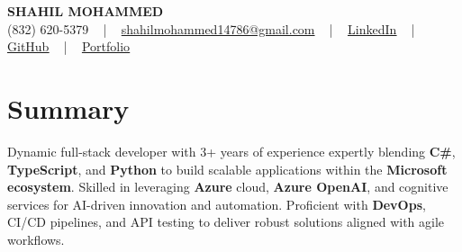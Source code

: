 \documentclass[letterpaper,10pt]{article}
\begin{document}
\begin{center}
    {\fontsize{14pt}{12pt}\selectfont \textbf{\MakeUppercase{Shahil Mohammed}}}\\ \vspace{2pt}
    \fontsize{10pt}{12pt}\selectfont (832) 620-5379 ~ | ~ \href{mailto:shahilmohammed14786@gmail.com}{shahilmohammed14786@gmail.com} ~ | ~  
    \href{https://www.linkedin.com/in/shahil-mohammed-9652931a1/}{\color{blue}\underline{LinkedIn}}  ~ | ~ 
    \href{https://github.com/freakbeast14}{\color{blue}\underline{GitHub}} ~ | ~ 
    \href{https://shahil-mohammed.netlify.app/}{\color{blue}\underline{Portfolio}}
    \vspace{-8pt}
\end{center}

\section{Summary}
\vspace{-2pt}\fontsize{8pt}{9pt}\selectfont
Dynamic full-stack developer with 3+ years of experience expertly blending \textbf{C\#}, \textbf{TypeScript}, and \textbf{Python} to build scalable applications within the \textbf{Microsoft ecosystem}. Skilled in leveraging \textbf{Azure} cloud, \textbf{Azure OpenAI}, and cognitive services for AI-driven innovation and automation. Proficient with \textbf{DevOps}, CI/CD pipelines, and API testing to deliver robust solutions aligned with agile workflows.
 \vspace{-5pt}
 
\vspace{-2pt}
\end{document}
